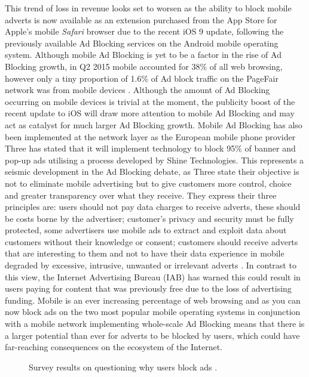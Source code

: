 \documentclass[12pt]{article}
\begin{document}
This trend of loss in revenue looks set to worsen as the ability to block mobile adverts is now available as an extension purchased from the App Store for Apple's mobile \textit{Safari} browser due to the recent iOS 9 update, following the previously available Ad Blocking services on the Android mobile operating system. Although mobile Ad Blocking is yet to be a factor in the rise of Ad Blocking growth, in Q2 2015 mobile accounted for 38\% of all web browsing, however only a tiny proportion of 1.6\% of Ad block traffic on the PageFair network was from mobile devices \parencite{adobeAdBlock}. Although the amount of Ad Blocking occurring on mobile devices is trivial at the moment, the publicity boost of the recent update to iOS will draw more attention to mobile Ad Blocking and may act as catalyst for  much larger Ad Blocking growth. Mobile Ad Blocking has also been implemented at the network layer as the European mobile phone provider Three has stated that it will implement technology to block 95\% of banner and pop-up ads utilising a process developed by Shine Technologies. This represents a seismic development in the Ad Blocking debate, as Three state their objective is not to eliminate mobile advertising but to give customers more control, choice and greater transparency over what they receive. They express their three principles are: users should not pay data charges to receive adverts, these should be costs borne by the advertiser; customer's privacy and security must be fully protected, some advertisers use mobile ads to extract and exploit data about customers without their knowledge or consent; customers should receive adverts that are interesting to them and not to have their data experience in mobile degraded by excessive, intrusive, unwanted or irrelevant adverts \parencite{threeAdBlock}. In contrast to this view, the Internet Advertising Bureau (IAB) has warned this could result in users paying for content that was previously free due to the loss of advertising funding. Mobile is an ever increasing percentage of web browsing and as you can now block ads on the two most popular mobile operating systems in conjunction with a  mobile network implementing whole-scale Ad Blocking means that there is a larger potential than ever for adverts to be blocked by users, which could have far-reaching consequences on the ecosystem of the Internet.  \\

\begin{figure} [H]
    \centering
        \caption{Survey results on questioning why users block ads \parencite{publishersWeb}.}
        \label{fig:adBlockingChart}
\end{figure}
\end{document}
